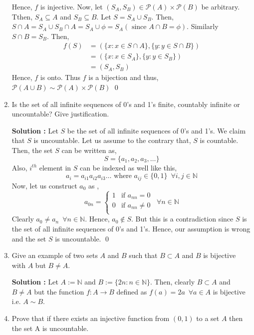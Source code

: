 \documentclass[10pt]{article}
\newcommand{\nn}{\mathbb{N}}
\newcommand{\p}{\mathcal{P}}
\begin{document}
\begin{enumerate}
    Hence, $f$ is injective. Now, let $(S_A, S_B) \in \p(A) \times \p(B)$ be arbitrary. Tthen, $S_A \subseteq A$ and $S_B \subseteq B$.
    Let $S = S_A \cup S_B$. Then, $S \cap A = S_A \cup S_B \cap A = S_A \cup \phi = S_A (\text{ since } A \cap B = \phi)$. Similarly $S \cap B = S_B$.
    Then, 
    \begin{align*}
	f(S) &= (\{ x : x \in S \cap A \}, \{ y : y \in S \cap B \}) \\
     	&= (\{x : x \in S_A\}, \{y : y \in S_B\})\\
	&=(S_A, S_B)
    \end{align*}
    Hence, $f$ is onto. Thus $f$ is a bijection and thus, $\p(A \cup B) \sim \p(A) \times \p(B)$ \qed

    \item Is the set of all infinite sequences of 0's and 1's finite, countably infinite or uncountable? Give justification.

    \textbf{Solution : }Let $S$ be the set of all infinite sequences of 0's and 1's. We claim that $S$ is uncountable. Let us assume to the contrary that, $S$ is countable. Then, the set $S$ can be written as, $$S = \{ a_1, a_2, a_3, \dots \}$$ Also, $i^{th}$ element in $S$ can be indexed as well like this, $$a_i = a_{i1} a_{i2} a_{i3} \dots \text{ where } a_{ij} \in \{0, 1\} \,\,\, \forall i,j \in \nn$$ 
    Now, let us construct $a_0$ as ,
    \begin{equation*}
        a_{0n} = 
        \begin{cases}
            1 & \text{if }a_{nn} = 0 \\
            0 & \text{if }a_{nn} \neq 0\\
        \end{cases}
        \,\,\, \forall n \in \nn
    \end{equation*}
    Clearly $a_0 \neq a_n \,\,\, \forall n \in \nn$. Hence, $a_0 \notin S$. But this is a contradiction since $S$ is the set of all infinite sequences of 0's and 1's. Hence, our assumption is wrong and the set $S$ is uncountable. \qed
    \item Give an example of two sets $A$ and $B$ such that $B \subset A$ and $B$ is bijective with $A$ but $B \neq A$.

    \textbf{Solution : }Let $A := \nn$ and $B := \{2n : n \in \nn \}$. Then, clearly $B \subset A$ and $B \neq A$ but the function $f : A \to B$ defined as $f(a) = 2a \,\,\, \forall a \in A$ is bijective i.e. $A \sim B$.
    \item Prove that if there exists an injective function from $(0, 1)$ to a set $A$ then the set A is uncountable.


\end{enumerate}
\end{document}
